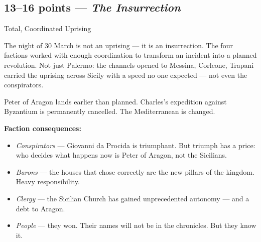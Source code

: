 
\secsep

\subsection{13--16 points --- \textit{The Insurrection}}
\textcolor{oro}{\cinzel\large Total, Coordinated Uprising}

\filetto

The night of 30 March is not an uprising --- it is an insurrection.
The four factions worked with enough coordination to transform an
incident into a planned revolution. Not just Palermo: the channels
opened to Messina, Corleone, Trapani carried the uprising across
Sicily with a speed no one expected --- not even the conspirators.

Peter of Aragon lands earlier than planned. Charles's expedition against
Byzantium is permanently cancelled. The Mediterranean is changed.

\textbf{Faction consequences:}
\begin{itemize}[nosep]
  \item \textit{Conspirators} --- Giovanni da Procida is triumphant.
    But triumph has a price: who decides what happens now is Peter of
    Aragon, not the Sicilians.
  \item \textit{Barons} --- the houses that chose correctly are the
    new pillars of the kingdom. Heavy responsibility.
  \item \textit{Clergy} --- the Sicilian Church has gained unprecedented
    autonomy --- and a debt to Aragon.
  \item \textit{People} --- they won. Their names will not be in the
    chronicles. But they know it.
\end{itemize}


\secsep

